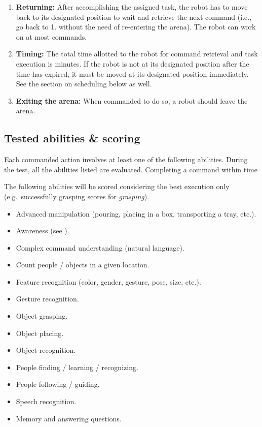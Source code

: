 \begin{enumerate}
	\item \textbf{Returning:} After accomplishing the assigned task, the robot has to move back to its designated position to wait and retrieve the next command (i.e., go back to 1. without the need of re-entering the arena). The robot can work on at most \eegpsrMaxCmd commands. \\

	\item \textbf{Timing:} The total time allotted to the robot for command retrieval and task execution is \eegpsrMaxTeamTime minutes. If the robot is not at its designated position after the time has expired, it must be moved at its designated position immediately. See the section on scheduling below as well.\\

	\item \textbf{Exiting the arena:} When commanded to do so, a robot should leave the arena. \\

\end{enumerate}

\subsection{Tested abilities \& scoring}
\label{sec:eegpsr-abilities}
Each commanded action involves at least one of the following abilities. During the test, all the abilities listed are evaluated. Completing a command within time 

The following abilities will be scored considering the best execution only (e.g.~successfully grasping scores for \textit{grasping}).

\begin{itemize}
	\item Advanced manipulation (pouring, placing in a box, transporting a tray, etc.).
	\item Awareness (see ).
	\item Complex command understanding (natural language).
	\item Count people / objects in a given location.
	\item Feature recognition (color, gender, gesture, pose, size, etc.).
	\item Gesture recognition.
	\item Object grasping.
	\item Object placing.
	\item Object recognition.
	\item People finding / learning / recognizing.
	\item People following / guiding.
	\item Speech recognition.
	\item Memory and answering questions.
\end{itemize}

